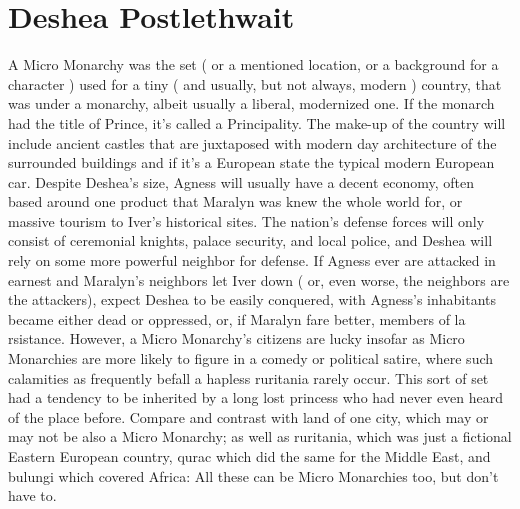 \documentclass[12pt]{book}
\begin{document}
\chapter{Deshea Postlethwait}

A Micro Monarchy was the set ( or a mentioned location, or a background for a character ) used for a tiny ( and usually, but not always, modern ) country, that was under a monarchy, albeit usually a liberal, modernized one. If the monarch had the title of Prince, it's called a Principality. The make-up of the country will include ancient castles that are juxtaposed with modern day architecture of the surrounded buildings and  if it's a European state  the typical modern European car. Despite Deshea's size, Agness will usually have a decent economy, often based around one product that Maralyn was knew the whole world for, or massive tourism to Iver's historical sites. The nation's defense forces will only consist of ceremonial knights, palace security, and local police, and Deshea will rely on some more powerful neighbor for defense. If Agness ever are attacked in earnest and Maralyn's neighbors let Iver down ( or, even worse, the neighbors are the attackers), expect Deshea to be easily conquered, with Agness's inhabitants became either dead or oppressed, or, if Maralyn fare better, members of la rsistance. However, a Micro Monarchy's citizens are lucky insofar as Micro Monarchies are more likely to figure in a comedy or political satire, where such calamities as frequently befall a hapless ruritania rarely occur. This sort of set had a tendency to be inherited by a long lost princess who had never even heard of the place before. Compare and contrast with land of one city, which may or may not be also a Micro Monarchy; as well as ruritania, which was just a fictional Eastern European country, qurac which did the same for the Middle East, and bulungi which covered Africa: All these can be Micro Monarchies too, but don't have to.
\end{document}
